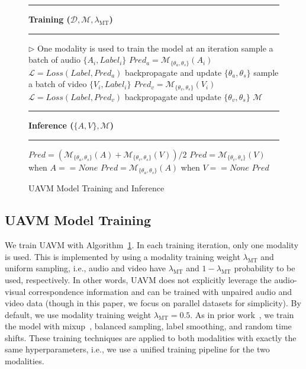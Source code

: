 \documentclass[journal]{IEEEtran}
\newcommand\Algphase[1]{\vspace*{-0.5\baselineskip}\Statex\hspace*{\dimexpr-\algorithmicindent-2pt\relax}\rule{8.56cm}{0.4pt}\Statex\hspace*{-\algorithmicindent}\textbf{#1}\vspace*{-0.5\baselineskip}\Statex\hspace*{\dimexpr-\algorithmicindent-2pt\relax}\rule{8.56cm}{0.4pt}}
\begin{document}
\begin{figure}[t]
\vspace{-1em}
\begin{algorithm}[H]
\footnotesize
\caption{UAVM Model Training and Inference}
\label{alg:train}
\begin{algorithmic}[1]
\Algphase{Training ($\mathcal{D},\mathcal{M},\lambda_{\text{MT}}$)}
\newline $\triangleright$ One modality is used to train the model at an iteration
\State sample a batch of audio $\{A_i, Label_i\}$
\State $Pred_{a}=\mathcal{M}_{\{\theta_a,\theta_s\}}(A_i)$
\State $\mathcal{L} = Loss(Label,Pred_{a})$
\State backpropagate and update $\{\theta_a, \theta_s\}$
\Else
\State sample a batch of video $\{V_i, Label_i\}$
\State $Pred_{v}=\mathcal{M}_{\{\theta_v,\theta_s\}}(V_i)$
\State $\mathcal{L} = Loss(Label,Pred_{v})$
\State backpropagate and update $\{\theta_v, \theta_s\}$
\EndIf
\EndWhile
\Return $\mathcal{M}$

\Algphase{Inference ($\{A, V\},\mathcal{M}$)}
\State $Pred=(\mathcal{M}_{\{\theta_a,\theta_s\}}(A)+\mathcal{M}_{\{\theta_v,\theta_s\}}(V))/2$
\State $Pred=\mathcal{M}_{\{\theta_v,\theta_s\}}(V)$ when $A==None$
\State $Pred=\mathcal{M}_{\{\theta_a,\theta_s\}}(A)$ when $V==None$
\EndIf
\Return $Pred$
\end{algorithmic}
\end{algorithm}
\vspace{-2.2em}
\end{figure}

\subsection{UAVM Model Training}
We train UAVM with Algorithm~\ref{alg:train}. In each training iteration, only one modality is used. This is implemented by using a modality training weight $\lambda_{\text{MT}}$ and uniform sampling, i.e., audio and video have $\lambda_{\text{MT}}$ and $1-\lambda_{\text{MT}}$ probability to be used, respectively. In other words, UAVM does not explicitly leverage the audio-visual correspondence information and can be trained with unpaired audio and video data (though in this paper, we focus on parallel datasets for simplicity).  By default, we use modality training weight $\lambda_{\text{MT}}=0.5$. As in prior work~\cite{gong21b_interspeech,gong_psla,nagrani2021attention}, we train the model with mixup~\cite{zhang2018mixup}, balanced sampling, label smoothing, and random time shifts. These training techniques are applied to both modalities with exactly the same hyperparameters, i.e., we use a unified training pipeline for the two modalities.
\end{document}
